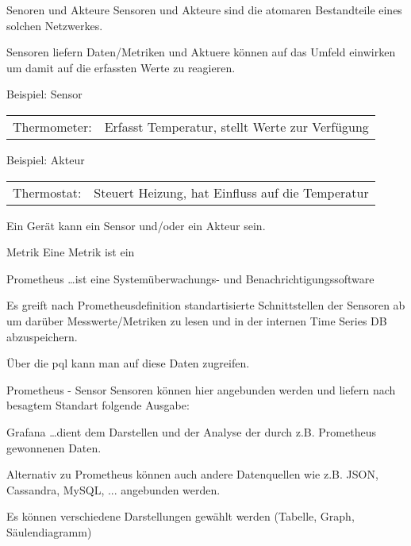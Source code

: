 \documentclass[12pt, pdf, xcolor={table, dvipsnames}, paperheight=8cm,paperwidth=12cm]{beamer}
\begin{document}
\begin{frame}{Senoren und Akteure}
	Sensoren und Akteure sind die atomaren Bestandteile eines solchen Netzwerkes.
	
	\vspace{1em}
	Sensoren liefern Daten/Metriken und Aktuere können auf das Umfeld einwirken um damit auf die erfassten Werte zu reagieren.
	\begin{block}{Beispiel: Sensor}
		\vspace{0.5em}
		\begin{tabularx}{\linewidth}{lX}Thermometer: & Erfasst Temperatur, stellt Werte zur  Verfügung
		\end{tabularx}
	\end{block}
	\begin{block}{Beispiel: Akteur}
	\vspace{0.5em}
	\begin{tabularx}{\linewidth}{lX}Thermostat: &Steuert Heizung, hat Einfluss auf die Temperatur
	\end{tabularx}
	\end{block}
Ein Gerät kann ein Sensor und/oder ein Akteur sein.
\end{frame}

\begin{frame}{Metrik}
	Eine Metrik ist ein 
\end{frame}

\begin{frame}{Prometheus}
	\dots ist eine Systemüberwachungs- und Benachrichtigungssoftware
	
	Es greift nach Prometheusdefinition standartisierte Schnittstellen der Sensoren ab um darüber Messwerte/Metriken zu lesen und in der internen Time Series DB abzuspeichern.
	
	Über die \gls{pql} kann man auf diese Daten zugreifen.
\end{frame}

\begin{frame}{Prometheus - Sensor}
	Sensoren können hier angebunden werden und liefern nach besagtem Standart folgende Ausgabe:
	
	
\end{frame}

\begin{frame}{Grafana}
	\dots dient dem Darstellen und der Analyse der durch z.B. Prometheus gewonnenen Daten.
	
	Alternativ zu Prometheus können auch andere Datenquellen wie z.B. JSON, Cassandra, MySQL, ... angebunden werden.
	
	Es können verschiedene Darstellungen gewählt werden (Tabelle, Graph, Säulendiagramm)
\end{frame}
\end{document}
